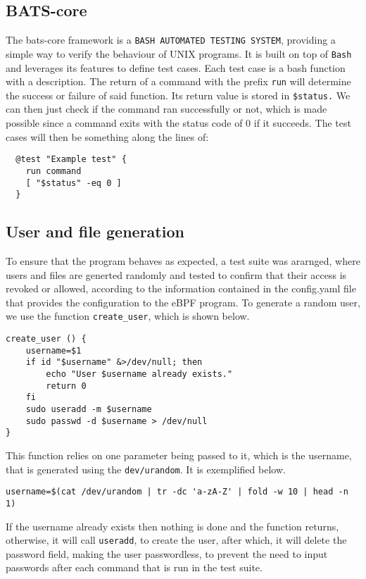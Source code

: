 \subsection{BATS-core}
The bats-core framework is a \texttt{BASH AUTOMATED TESTING SYSTEM}, providing a simple way to verify the behaviour of UNIX programs. It is built on top of \texttt{Bash} and leverages its features to define test cases. Each test case is a bash function with a description. The return of a command with the prefix \texttt{run} will determine the success or failure of said function. Its return value is stored in \texttt{\$status.} We can then just check if the command ran successfully or not, which is made possible since a command exits with the status code of 0 if it succeeds.
The test cases will then be something along the lines of:

\begin{lstlisting}
  @test "Example test" {
    run command
    [ "$status" -eq 0 ]
  }
\end{lstlisting}

\subsection{User and file generation}
To ensure that the program behaves as expected, a test suite was ararnged, where users and files are generted randomly and tested to confirm that their access is revoked or allowed, according to the information contained in the config.yaml file that provides the configuration to the eBPF program.
To generate a random user, we use the function \texttt{create\_user}, which is shown below.

\begin{lstlisting}
create_user () {
    username=$1
    if id "$username" &>/dev/null; then
        echo "User $username already exists."
        return 0
    fi
    sudo useradd -m $username
    sudo passwd -d $username > /dev/null
}
\end{lstlisting}

This function relies on one parameter being passed to it, which is the username, that is generated using the \texttt{dev/urandom}. It is exemplified below.

\begin{lstlisting}
username=$(cat /dev/urandom | tr -dc 'a-zA-Z' | fold -w 10 | head -n 1)
\end{lstlisting}

If the username already exists then nothing is done and the function returns, otherwise, it will call \texttt{useradd}, to create the user, after which, it will delete the password field, making the user passwordless, to prevent the need to input passwords after each command that is run in the test suite.

